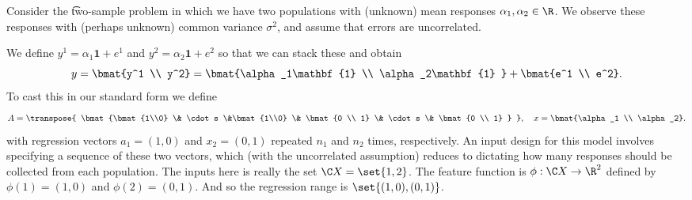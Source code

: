 Consider the \t{two-sample problem} in which we have two populations with (unknown) mean responses $\alpha _1, \alpha _2 \in \R $.
We observe these responses with (perhaps unknown) common variance $\sigma ^2$, and assume that errors are uncorrelated.

We define $y^1 = \alpha _1\mathbf{1}  + e^1$ and $y^2 = \alpha _2\mathbf{1}  + e^2$ so that we can stack these and obtain
    \[
y = \bmat{y^1 \\ y^2} = \bmat{\alpha _1\mathbf{1}  \\ \alpha _2\mathbf{1} } + \bmat{e^1 \\ e^2}.
    \]
To cast this in our standard form we define
    \[
A = \transpose{
\bmat{\bmat{1\\0} \& \cdot s \&\bmat{1\\0} \& \bmat{0 \\ 1} \& \cdot s \& \bmat{0 \\ 1}
}
}, \quad x = \bmat{\alpha _1 \\ \alpha _2}.
    \]
with regression vectors $a_1 = (1, 0)$ and $x_2 = (0, 1)$ repeated $n_1$ and $n_2$ times, respectively.
An input design for this model involves specifying a sequence of these two vectors, which (with the uncorrelated assumption) reduces to dictating how many responses should be collected from each population.
The inputs here is really the set $\C X = \set{1, 2}$.
The feature function is $\phi : \C X \to \R ^2$ defined by $\phi (1) = (1, 0)$ and $\phi (2) = (0, 1)$.
And so the regression range is $\set{(1, 0), (0, 1)}$.
